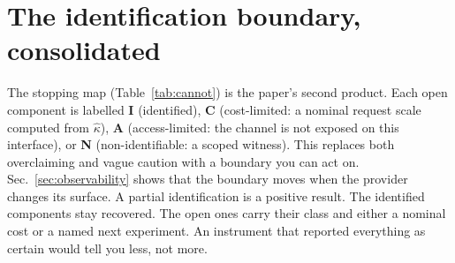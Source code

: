 \section{The identification boundary, consolidated}
\label{sec:boundary}
The stopping map (Table~\ref{tab:cannot}) is the paper's second product.  Each open
component is labelled \textbf{I} (identified), \textbf{C} (cost-limited: a nominal
request scale computed from $\hat\kappa$), \textbf{A} (access-limited: the channel is
not exposed on this interface), or \textbf{N} (non-identifiable: a scoped witness).
This replaces both overclaiming and vague caution with a boundary you can act on.
Sec.~\ref{sec:observability} shows that the boundary moves when the provider changes
its surface.  A partial identification is a positive result.  The identified components
stay recovered.  The open ones carry their class and either a nominal cost or a named
next experiment.  An instrument that reported everything as certain would tell you
less, not more.

